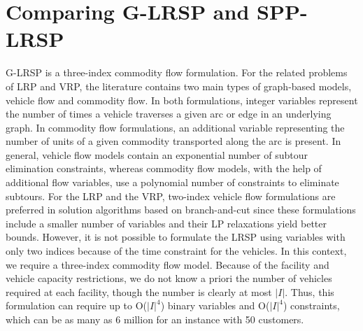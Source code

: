 


\section{Comparing G-LRSP and SPP-LRSP}
\label{sec:comp-form}
G-LRSP is a three-index commodity flow formulation.
For the related problems of LRP and VRP, the literature contains 
two main types of graph-based models, vehicle flow and 
commodity flow. In both formulations, integer variables 
represent the number of times a vehicle traverses a 
given arc or edge in an underlying graph. In commodity
flow formulations, an additional variable representing the 
number of units of a given commodity transported along the 
arc is present. In general, vehicle flow models contain an 
exponential number of subtour elimination constraints, 
whereas commodity flow models, with the help of additional 
flow variables, use a polynomial number of constraints to 
eliminate subtours. For the LRP and the VRP, two-index 
vehicle flow formulations are preferred in solution algorithms 
based on branch-and-cut since these formulations include 
a smaller number of variables and their LP relaxations 
yield better bounds. However, it is not possible to formulate 
the LRSP using variables with only two indices because of 
the time constraint for the vehicles. In this context, 
we require a three-index commodity flow model.
Because of the facility and vehicle capacity restrictions, 
we do not know a priori the number of vehicles required at 
each facility, though the number is clearly at most $|I|$. 
Thus, this formulation can require up to O($|I|^4$) binary 
variables and O($|I|^4$) constraints, which can be as many as 
6 million for an instance with 50 customers. 

